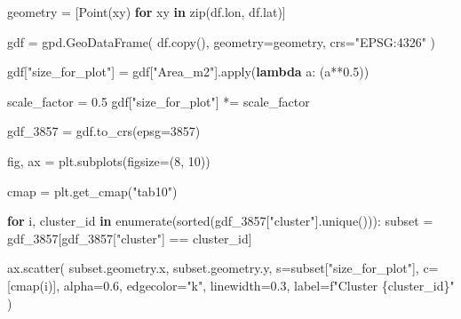 \documentclass[
  letterpaper,
  DIV=11,
  numbers=noendperiod]{scrreprt}
\newenvironment{Shaded}{\begin{snugshade}}{\end{snugshade}}
\newcommand{\BuiltInTok}[1]{\textcolor[rgb]{0.00,0.23,0.31}{#1}}
\newcommand{\ControlFlowTok}[1]{\textcolor[rgb]{0.00,0.23,0.31}{\textbf{#1}}}
\newcommand{\DecValTok}[1]{\textcolor[rgb]{0.68,0.00,0.00}{#1}}
\newcommand{\FloatTok}[1]{\textcolor[rgb]{0.68,0.00,0.00}{#1}}
\newcommand{\KeywordTok}[1]{\textcolor[rgb]{0.00,0.23,0.31}{\textbf{#1}}}
\newcommand{\NormalTok}[1]{\textcolor[rgb]{0.00,0.23,0.31}{#1}}
\newcommand{\OperatorTok}[1]{\textcolor[rgb]{0.37,0.37,0.37}{#1}}
\newcommand{\SpecialCharTok}[1]{\textcolor[rgb]{0.37,0.37,0.37}{#1}}
\newcommand{\SpecialStringTok}[1]{\textcolor[rgb]{0.13,0.47,0.30}{#1}}
\newcommand{\StringTok}[1]{\textcolor[rgb]{0.13,0.47,0.30}{#1}}
\begin{document}
\begin{Shaded}
\begin{Highlighting}[]
\NormalTok{geometry }\OperatorTok{=}\NormalTok{ [Point(xy) }\ControlFlowTok{for}\NormalTok{ xy }\KeywordTok{in} \BuiltInTok{zip}\NormalTok{(df.lon, df.lat)]}

\NormalTok{gdf }\OperatorTok{=}\NormalTok{ gpd.GeoDataFrame(}
\NormalTok{    df.copy(), }
\NormalTok{    geometry}\OperatorTok{=}\NormalTok{geometry,}
\NormalTok{    crs}\OperatorTok{=}\StringTok{"EPSG:4326"}
\NormalTok{)}

\NormalTok{gdf[}\StringTok{"size\_for\_plot"}\NormalTok{] }\OperatorTok{=}\NormalTok{ gdf[}\StringTok{"Area\_m2"}\NormalTok{].}\BuiltInTok{apply}\NormalTok{(}\KeywordTok{lambda}\NormalTok{ a: (a}\OperatorTok{**}\FloatTok{0.5}\NormalTok{))}

\NormalTok{scale\_factor }\OperatorTok{=} \FloatTok{0.5}
\NormalTok{gdf[}\StringTok{"size\_for\_plot"}\NormalTok{] }\OperatorTok{*=}\NormalTok{ scale\_factor}

\NormalTok{gdf\_3857 }\OperatorTok{=}\NormalTok{ gdf.to\_crs(epsg}\OperatorTok{=}\DecValTok{3857}\NormalTok{)}

\NormalTok{fig, ax }\OperatorTok{=}\NormalTok{ plt.subplots(figsize}\OperatorTok{=}\NormalTok{(}\DecValTok{8}\NormalTok{, }\DecValTok{10}\NormalTok{))}

\NormalTok{cmap }\OperatorTok{=}\NormalTok{ plt.get\_cmap(}\StringTok{"tab10"}\NormalTok{)}

\ControlFlowTok{for}\NormalTok{ i, cluster\_id }\KeywordTok{in} \BuiltInTok{enumerate}\NormalTok{(}\BuiltInTok{sorted}\NormalTok{(gdf\_3857[}\StringTok{"cluster"}\NormalTok{].unique())):}
\NormalTok{    subset }\OperatorTok{=}\NormalTok{ gdf\_3857[gdf\_3857[}\StringTok{"cluster"}\NormalTok{] }\OperatorTok{==}\NormalTok{ cluster\_id]}
    
\NormalTok{    ax.scatter(}
\NormalTok{        subset.geometry.x, }
\NormalTok{        subset.geometry.y,}
\NormalTok{        s}\OperatorTok{=}\NormalTok{subset[}\StringTok{"size\_for\_plot"}\NormalTok{],}
\NormalTok{        c}\OperatorTok{=}\NormalTok{[cmap(i)],}
\NormalTok{        alpha}\OperatorTok{=}\FloatTok{0.6}\NormalTok{,}
\NormalTok{        edgecolor}\OperatorTok{=}\StringTok{"k"}\NormalTok{,}
\NormalTok{        linewidth}\OperatorTok{=}\FloatTok{0.3}\NormalTok{,}
\NormalTok{        label}\OperatorTok{=}\SpecialStringTok{f"Cluster }\SpecialCharTok{\{}\NormalTok{cluster\_id}\SpecialCharTok{\}}\SpecialStringTok{"}
\NormalTok{    )}


\end{Highlighting}
\end{Shaded}
\end{document}
